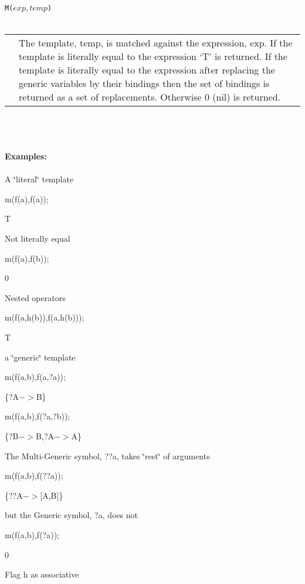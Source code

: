 \documentclass{article}
\begin{document}
\pagebreak

{\tt M($exp,temp$)} \\
\ \\
\begin{tabular}{lp{11cm}}
\hspace*{0.2cm} & The template, temp, is matched against the expression, exp. If the
template is literally equal to the expression `T' is returned. If the
template is literally equal to the expression after replacing the
generic variables by their bindings then the set of bindings is returned
as a set of replacements. Otherwise 0 (nil) is returned. \\
\end{tabular} \\
\ \\
\ \\
{\bf Examples:} \\
\ \\


 A \char`\"{}literal\char`\"{} template

 m(f(a),f(a));

 T



 Not literally equal

 m(f(a),f(b));

 0



 Nested operators

 m(f(a,h(b)),f(a,h(b)));

 T



 a \char`\"{}generic\char`\"{} template

 m(f(a,b),f(a,?a));

 \{?A$->$B\}



 m(f(a,b),f(?a,?b));

 \{?B$->$B,?A$->$A\}



 The Multi-Generic symbol, ??a, takes \char`\"{}rest\char`\"{} of arguments

 m(f(a,b),f(??a));

 \{??A$->${[}A,B{]}\}



 but the Generic symbol, ?a, does not

 m(f(a,b),f(?a));

 0



 Flag h as associative
\end{document}
